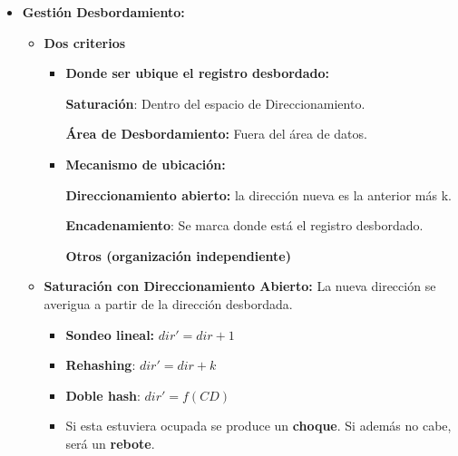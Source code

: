 \documentclass[12pt, twoside, openright]{report} %
\begin{document}
\begin{itemize}
\begin{itemize}
\begin{itemize}
\begin{itemize}
          \end{itemize}
        \end{itemize}
      \end{itemize}
    \item \textbf{Gestión Desbordamiento:}
      

      \begin{itemize}
      \item \textbf{Dos criterios}
        

        \begin{itemize}
        \item \textbf{Donde ser ubique el registro desbordado:}
          

       
		  
            \textbf{Saturación}: Dentro del espacio de Direccionamiento.
          
			
            \textbf{Área de Desbordamiento:} Fuera del área de datos.
            
			
        \item \textbf{Mecanismo de ubicación:}
          

          
            \textbf{Direccionamiento abierto:} la dirección nueva es la
            anterior más k.
           
			
            \textbf{Encadenamiento}: Se marca donde está el registro
            desbordado.
           
			
            \textbf{Otros (organización independiente)}
          
			
        \end{itemize}
      \item \textbf{Saturación con Direccionamiento Abierto:} La nueva
        dirección se averigua a partir de la dirección desbordada.
        

        \begin{itemize}
        \item \textbf{Sondeo lineal:} $dir'= dir+1$
          
        \item \textbf{Rehashing}: $dir'= dir+k$
          
        \item \textbf{Doble hash}: $dir'=f(CD)$
          
        \end{itemize}

        \begin{itemize}
        \item Si esta estuviera ocupada se produce un \textbf{choque}. Si
          además no cabe, será un \textbf{rebote}.
          

\end{itemize}
\end{itemize}
\end{itemize}
\end{document}

